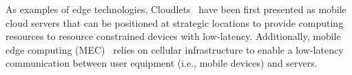 As examples of edge technologies, Cloudlets~\cite{Satyanarayanan:2009} have been first presented as mobile cloud servers that can be positioned at strategic locations to provide computing resources to resource constrained devices with low-latency. 
Additionally, mobile edge computing (MEC)~\cite{ahmed2016isco} relies on cellular infrastructure to enable a low-latency communication between user equipment (i.e., mobile devices) and servers. 

